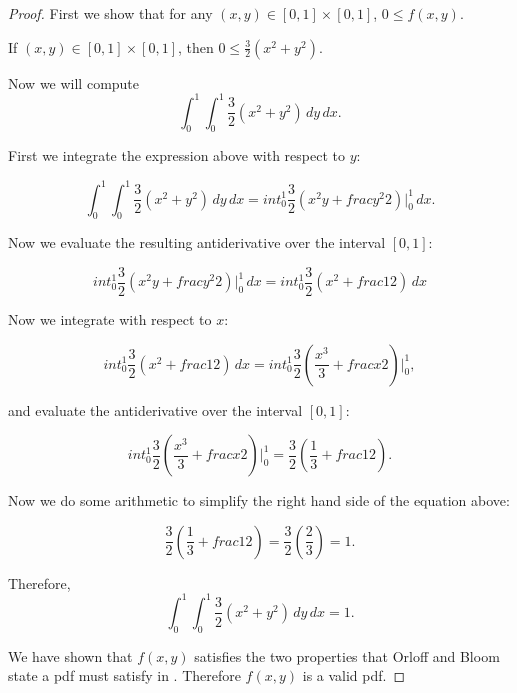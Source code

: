 \documentclass[a4paper,11pt]{article}
\begin{document}
\begin{proof}
First we show that for any $\left(x, y \right) \in \left[0, 1 \right]
\times \left[0, 1 \right]$, $0 \leq f\left(x, y \right)$.

If $\left(x, y \right) \in \left[0,1\right] \times \left[0, 1\right]$,
then $0 \leq \frac{3}{2}\left( x^2 + y^2 \right)$.

Now we will compute
\begin{equation}
\int_0^1 \int_0^1 \frac{3}{2}\left( x^2 + y^2 \right) \,dy \,dx.
\end{equation}

First we integrate the expression above with respect to $y$:

\begin{equation}
\int_0^1 \int_0^1 \frac{3}{2}\left( x^2 + y^2 \right) \,dy \,dx
= int_0^1 \frac{3}{2} \left( x^2y + frac{y^2}{2} \right) \bigg\rvert_0^1 \,dx.
\end{equation}

Now we evaluate the resulting antiderivative over the interval
$\left[0, 1 \right]$:

\begin{equation}
int_0^1 \frac{3}{2} \left( x^2y + frac{y^2}{2} \right) \bigg\rvert_0^1 \,dx
= int_0^1 \frac{3}{2} \left( x^2 + frac{1}{2} \right)  \,dx
\end{equation}

Now we integrate with respect to $x$:

\begin{equation}
int_0^1 \frac{3}{2} \left( x^2 + frac{1}{2} \right)  \,dx
= int_0^1 \frac{3}{2} \left( \frac{x^3}{3} + frac{x}{2} \right)  \bigg\rvert_0^1,
\end{equation}

and evaluate the antiderivative over the interval $\left[0, 1\right]$:

\begin{equation}
int_0^1 \frac{3}{2} \left( \frac{x^3}{3} + frac{x}{2} \right)  \bigg\rvert_0^1
 = \frac{3}{2} \left( \frac{1}{3} + frac{1}{2} \right).
\end{equation}

Now we do some arithmetic to simplify the right hand side of the
equation above:

\begin{equation}
\frac{3}{2} \left( \frac{1}{3} + frac{1}{2} \right)
= \frac{3}{2} \left( \frac{2}{3} \right) = 1.
\end{equation}

Therefore,
\begin{equation}
\int_0^1 \int_0^1 \frac{3}{2}\left( x^2 + y^2 \right) \,dy \,dx = 1.
\end{equation}

We have shown that $f\left(x, y \right)$ satisfies the two properties
that Orloff and Bloom state a pdf must satisfy in \cite{reading7}.
Therefore $f\left(x , y \right)$ is a valid pdf.
\end{proof}
\end{document}
